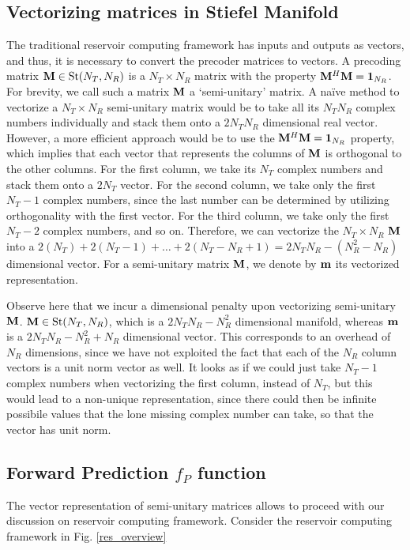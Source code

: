 \documentclass[conference]{IEEEtran}
\begin{document}
\subsection{Vectorizing matrices in Stiefel Manifold}
\label{vectorize}
The traditional reservoir computing framework has inputs and outputs as vectors, and thus, it is necessary to convert the precoder matrices to vectors.
A precoding matrix $\mathcal{{\bf M}} \in \text{St}(N_T,N_R)$ is a $N_T\times N_R$ matrix with the property $\mathcal{{\bf M}}^H\mathcal{{\bf M}}=\text{\textbf{1}}_{N_R}$.
For brevity, we call such a matrix $\mathcal{{\bf M}}$ a `semi-unitary' matrix.
A na{\"i}ve method to vectorize a $N_T\times N_R$ semi-unitary matrix would be to take all its $N_TN_R$ complex numbers individually and stack them onto a $2N_TN_R$ dimensional real vector.
However, a more efficient approach would be to use the $\mathcal{{\bf M}}^H\mathcal{{\bf M}}=\text{\textbf{1}}_{N_R}$ property, which implies that each vector that represents the columns of $\mathcal{{\bf M}}$ is orthogonal to the other columns.
For the first column, we take its $N_T$ complex numbers and stack them onto a $2N_T$ vector.
For the second column, we take only the first $N_T-1$ complex numbers, since the last number can be determined by utilizing orthogonality with the first vector.
For the third column, we take only the first $N_T-2$ complex numbers, and so on.
Therefore, we can vectorize the $N_T\times N_R$ $\mathcal{{\bf M}}$ into a $2(N_T)+2(N_T-1)+\ldots+2(N_T-N_R+1)= 2N_TN_R-(N_R^2-N_R)$ dimensional vector.
For a semi-unitary matrix $\mathcal{{\bf M}}$, we denote by $\mathcal{{\bf m}}$ its vectorized representation.

Observe here that we incur a dimensional penalty upon vectorizing semi-unitary $\mathcal{{\bf M}}$.
$\mathcal{{\bf M}} \in \text{St}(N_T,N_R)$, which is a $2N_TN_R-N_R^2$ dimensional manifold, whereas $\mathcal{{\bf m}}$ is a $2N_TN_R-N_R^2+N_R$ dimensional vector.
This corresponds to an overhead of $N_R$ dimensions, since we have not exploited the fact that each of the $N_R$ column vectors is a unit norm vector as well.
It looks as if we could just take $N_T-1$ complex numbers when vectorizing the first column, instead of $N_T$, but this would lead to a non-unique representation, since there could then be infinite possibile values that the lone missing complex number can take, so that the vector has unit norm.
\subsection{Forward Prediction $f_P$ function}
\noindent The vector representation of semi-unitary matrices allows to proceed with our discussion on reservoir computing framework.
Consider the reservoir computing framework in Fig. \ref{res_overview} %
\end{document}
